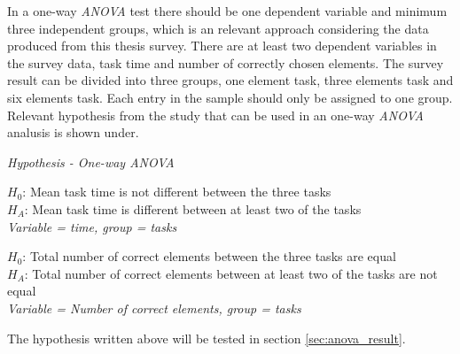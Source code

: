 In a one-way \textit{ANOVA} test there should be one dependent variable and minimum three independent groups, which is an relevant approach considering the data produced from this thesis survey. There are at least two dependent variables in the survey data, task time and number of correctly chosen elements. The survey result can be divided into three groups, one element task, three elements task and six elements task. Each entry in the sample should only be assigned to one group. Relevant hypothesis from the study that can be used in an one-way \textit{ANOVA} analusis is shown under. \newline

\begin{framed}
		\begin{center}
			\textit{Hypothesis - One-way \textit{ANOVA}} \newline
			
			$H_{0}$: Mean task time is not different between the three tasks\\
			$H_{A}$: Mean task time is different between at least two of the tasks\\
			\textit{Variable = time, group = tasks}\newline
			
			$H_{0}$: Total number of correct elements between the three tasks are equal \\
			$H_{A}$: Total number of correct elements between at least two of the tasks are not equal \\
			\textit{Variable = Number of correct elements, group = tasks}\newline
	\end{center}
\end{framed}

The hypothesis written above will be tested in section \ref{sec:anova_result}. %



